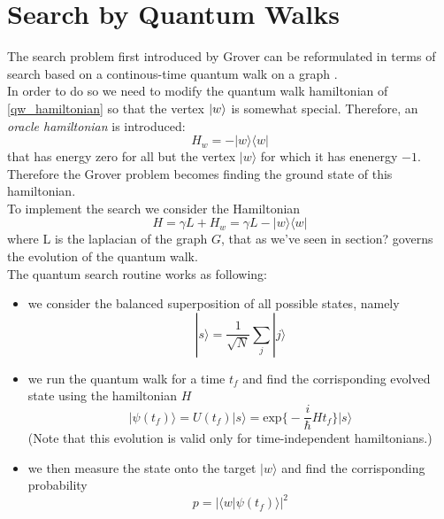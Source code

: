 \section{Search by Quantum Walks}
The search problem first introduced by Grover can be reformulated in terms of search based on a continous-time quantum walk on a graph \cite{Childs2004}. \\In order to do so we need to modify the quantum walk hamiltonian of \cref{qw_hamiltonian} so that the vertex ${|{w}\rangle}$ is somewhat special. Therefore, an \textit{oracle hamiltonian} is introduced:
\begin{equation}
  H_w = -|w\rangle\langle w|
\end{equation}
that has energy zero for all but the vertex $|w\rangle$ for which it has enenergy $-1$. Therefore the Grover problem becomes finding the ground state of this hamiltonian. \\To implement the search we consider the Hamiltonian
\begin{equation}
  H = \gamma L + H_w = \gamma L -|w\rangle\langle w|
\end{equation}
where L is the laplacian of the graph $G$, that as we've seen in section? governs the evolution of the quantum walk.\\
The quantum search routine works as following:
\begin{itemize}
  \item we consider the balanced superposition of all possible states, namely
  \begin{equation}
    |s\rangle = \frac{1}{\sqrt{N}}\sum_j|j\rangle
  \end{equation}

  \item we run the quantum walk for a time $t_f$ and find the corrisponding evolved state using the hamiltonian $H$
  \begin{equation}
  |\psi(t_f)\rangle = U(t_f)|s\rangle  = \mbox{exp}\Big\{-\frac{i}{\hbar}Ht_f\Big\}|s\rangle
  \end{equation}
  (Note that this evolution is valid only for time-independent hamiltonians.)

  \item we then measure the state onto the target $|w\rangle$ and find the corrisponding probability
  \begin{equation}
    p = |\langle w|\psi(t_f)\rangle|^2
  \end{equation}

\end{itemize}
